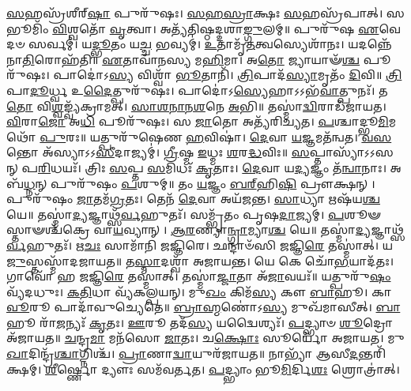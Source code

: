 

\-\ul{𑌸}\-𑌹𑌸𑍍𑌰᳴𑌶𑍀𑌰𑍍‌\-\ul{𑌷𑌾} 𑌪𑍁𑌰𑍁᳴𑌷𑌃। 
\-\ul{𑌸}\-\-\ul{𑌹}\-\-\ul{𑌸𑍍𑌰𑌾}\-𑌕𑍍𑌷𑌃 \ul{𑌸}\-𑌹𑌸𑍍𑌰᳴𑌪𑌾𑌤𑍍। 
𑌸 𑌭𑍂𑌮𑌿𑌂᳴ \ul{𑌵𑌿}\-𑌶𑍍𑌵𑌤𑍋᳴ \ul{𑌵𑍃}\-𑌤𑍍𑌵𑌾। 
𑌅𑌤𑍍𑌯᳴𑌤𑌿𑌷𑍍𑌠𑌦𑍍𑌦𑌶𑌾\-\ul{𑌙𑍍𑌗𑍁}\-𑌲𑌮𑍍॥ 
% 
𑌪𑍁𑌰𑍁᳴𑌷 \ul{𑌏}\-𑌵𑍇𑌦𑍞 𑌸𑌰𑍍𑌵𑌮𑍍॑। 
𑌯\-\ul{𑌦𑍍𑌭𑍂}\-𑌤𑌂 𑌯\-\ul{𑌚𑍍𑌚} 𑌭𑌵𑍍𑌯𑌮𑍍॑। 
\-\ul{𑌉}\-𑌤𑌾𑌮𑍃᳴\-\ul{𑌤}\-𑌤𑍍𑌵𑌸𑍍𑌯𑍇𑌶𑌾᳴𑌨𑌃। 
𑌯𑌦𑌨𑍍𑌨𑍇᳴𑌨𑌾\-\ul{𑌤𑌿}\-𑌰𑍋𑌹᳴𑌤𑌿॥ 
% 
\-\ul{𑌏}\-𑌤𑌾𑌵𑌾᳴𑌨𑌸𑍍𑌯 𑌮\-\ul{𑌹𑌿}\-𑌮𑌾। 
𑌅\-\ul{𑌤𑍋} 𑌜𑍍𑌯𑌾𑌯𑌾𑍟᳴\-\ul{𑌶𑍍𑌚} 𑌪𑍂𑌰𑍁᳴𑌷𑌃। 
𑌪𑌾𑌦𑍋॑𑌽\-\ul{𑌸𑍍𑌯} 𑌵𑌿𑌶𑍍𑌵𑌾᳴ \ul{𑌭𑍂}\-𑌤𑌾𑌨𑌿᳴। 
\-\ul{𑌤𑍍𑌰𑌿}\-𑌪𑌾𑌦᳴\-\ul{𑌸𑍍𑌯𑌾}\-𑌮𑍃𑌤𑌂᳴ \ul{𑌦𑌿}\-𑌵𑌿॥ 
% 
\-\ul{𑌤𑍍𑌰𑌿}\-𑌪𑌾\-\ul{𑌦𑍂}\-𑌰𑍍𑌧𑍍𑌵 𑌉\-\ul{𑌦𑍈}\-𑌤𑍍𑌪𑍁𑌰𑍁᳴𑌷𑌃। 
𑌪𑌾𑌦𑍋॑𑌽\-\ul{𑌸𑍍𑌯𑍇}\-𑌹𑌾𑌽𑌽𑌭᳴\-\ul{𑌵𑌾}\-𑌤𑍍𑌪𑍁𑌨𑌃᳴। 
𑌤\-\ul{𑌤𑍋} 𑌵𑌿\-\ul{𑌶𑍍𑌵}\-𑌙𑍍𑌵𑍍𑌯᳴𑌕𑍍𑌰𑌾𑌮𑌤𑍍। 
\-\ul{𑌸𑌾}\-\-\ul{𑌶}\-\-\ul{𑌨𑌾}\-\-\ul{𑌨}\-\-\ul{𑌶}\-𑌨𑍇 \ul{𑌅}\-𑌭𑌿॥ 
% 
𑌤𑌸𑍍𑌮𑌾॑\-\ul{𑌦𑍍𑌵𑌿}\-𑌰𑌾𑌡᳴𑌜𑌾𑌯𑌤। 
\-\ul{𑌵𑌿}\-𑌰𑌾\-\ul{𑌜𑍋} 𑌅\-\ul{𑌧𑌿} 𑌪𑍂𑌰𑍁᳴𑌷𑌃। 
𑌸 \ul{𑌜𑌾}\-𑌤𑍋 𑌅𑌤𑍍𑌯᳴𑌰𑌿𑌚𑍍𑌯𑌤। 
\-\ul{𑌪}\-𑌶𑍍𑌚𑌾𑌦𑍍𑌭𑍂\-\ul{𑌮𑌿}\-𑌮𑌥𑍋᳴ \ul{𑌪𑍁}\-𑌰𑌃॥ 
% 
 𑌯𑌤𑍍𑌪𑍁𑌰𑍁᳴𑌷𑍇𑌣 \ul{𑌹}\-𑌵𑌿𑌷𑌾॑। 
\-\ul{𑌦𑍇}\-𑌵𑌾 \ul{𑌯}\-𑌜𑍍𑌞𑌮𑌤᳴𑌨𑍍𑌵𑌤। 
\-\ul{𑌵}\-\-\ul{𑌸}\-𑌨𑍍𑌤𑍋 𑌅᳴𑌸𑍍𑌯𑌾𑌽𑌽\-\ul{𑌸𑍀}\-𑌦𑌾𑌜𑍍𑌯𑌮𑍍॑। 
\-\ul{𑌗𑍍𑌰𑍀}\-𑌷𑍍𑌮 \ul{𑌇}\-𑌧𑍍𑌮𑌃 \ul{𑌶}\-𑌰\-\ul{𑌦𑍍𑌧}\-𑌵𑌿𑌃॥ 
% 
 \ul{𑌸}\-𑌪𑍍𑌤𑌾𑌸𑍍𑌯𑌾᳴𑌽𑌽𑌸𑌨𑍍  𑌪\-\ul{𑌰𑌿}\-𑌧𑌯𑌃᳴। 
𑌤𑍍𑌰𑌿𑌃 \ul{𑌸}\-𑌪𑍍𑌤 \ul{𑌸}\-𑌮𑌿𑌧𑌃᳴ \ul{𑌕𑍃}\-𑌤𑌾𑌃। 
\-\ul{𑌦𑍇}\-𑌵𑌾 𑌯\-\ul{𑌦𑍍𑌯}\-𑌜𑍍𑌞𑌂 𑌤᳴\-\ul{𑌨𑍍𑌵𑌾}\-𑌨𑌾𑌃। 
𑌅𑌬᳴\-\ul{𑌧𑍍𑌨}\-𑌨𑍍 𑌪𑍁𑌰𑍁᳴𑌷𑌂 \ul{𑌪}\-𑌶𑍁𑌮𑍍॥ 
% 
 𑌤𑌂 \ul{𑌯}\-𑌜𑍍𑌞𑌂 \ul{𑌬}\-\ul{𑌰𑍍}‌𑌹𑌿\-\ul{𑌷𑌿} 𑌪𑍍𑌰𑍗𑌕𑍍𑌷𑌨𑍍। 
𑌪𑍁𑌰𑍁᳴𑌷𑌂 \ul{𑌜𑌾}\-𑌤𑌮᳴\-\ul{𑌗𑍍𑌰}\-𑌤𑌃। 
𑌤𑍇𑌨᳴ \ul{𑌦𑍇}\-𑌵𑌾 𑌅𑌯᳴𑌜𑌨𑍍𑌤। 
\-\ul{𑌸𑌾}\-𑌧𑍍𑌯𑌾 𑌋𑌷᳴𑌯\-\ul{𑌶𑍍𑌚} 𑌯𑍇॥ 
% 
𑌤𑌸𑍍𑌮𑌾॑\-\ul{𑌦𑍍𑌯}\-𑌜𑍍𑌞𑌾𑌥𑍍𑌸᳴\-\ul{𑌰𑍍𑌵}\-𑌹𑍁𑌤𑌃᳴। 
𑌸𑌮𑍍𑌭𑍃᳴𑌤𑌂 𑌪𑍃𑌷\-\ul{𑌦𑌾}\-𑌜𑍍𑌯𑌮𑍍। 
\-\ul{𑌪}\-𑌶𑍂𑍟𑌸𑍍𑌤𑌾𑍟𑌶𑍍𑌚᳴𑌕𑍍𑌰𑍇 𑌵𑌾\-\ul{𑌯}\-𑌵𑍍𑌯𑌾𑌨𑍍। 
\-\ul{𑌆}\-\-\ul{𑌰}\-𑌣𑍍𑌯𑌾\-\ul{𑌨𑍍𑌗𑍍𑌰𑌾}\-𑌮𑍍𑌯𑌾\-\ul{𑌶𑍍𑌚} 𑌯𑍇॥ 
% 
 𑌤𑌸𑍍𑌮𑌾॑\-\ul{𑌦𑍍𑌯}\-𑌜𑍍𑌞𑌾𑌥𑍍𑌸᳴\-\ul{𑌰𑍍𑌵}\-𑌹𑍁𑌤𑌃᳴। 
𑌋\-\ul{𑌚𑌃} 𑌸𑌾𑌮𑌾᳴𑌨𑌿 𑌜𑌜𑍍𑌞𑌿𑌰𑍇। 
𑌛𑌨𑍍𑌦𑌾𑍞᳴𑌸𑌿 𑌜𑌜𑍍𑌞𑌿\-\ul{𑌰𑍇} 𑌤𑌸𑍍𑌮𑌾॑𑌤𑍍। 
𑌯\-\ul{𑌜𑍁}\-𑌸𑍍𑌤𑌸𑍍𑌮𑌾᳴𑌦𑌜𑌾𑌯𑌤॥ 
% 
𑌤\-\ul{𑌸𑍍𑌮𑌾}\-𑌦𑌶𑍍𑌵𑌾᳴ 𑌅𑌜𑌾𑌯𑌨𑍍𑌤। 
𑌯𑍇 𑌕𑍇 𑌚𑍋᳴\-\ul{𑌭}\-𑌯𑌾𑌦᳴𑌤𑌃। 
𑌗𑌾𑌵𑍋᳴ 𑌹 𑌜𑌜𑍍𑌞𑌿\-\ul{𑌰𑍇} 𑌤𑌸𑍍𑌮𑌾॑𑌤𑍍। 
𑌤𑌸𑍍𑌮𑌾॑\-\ul{𑌜𑍍𑌜𑌾}\-𑌤𑌾 𑌅᳴\-\ul{𑌜𑌾}\-𑌵𑌯𑌃᳴॥ 
% 
𑌯𑌤𑍍𑌪𑍁𑌰𑍁᳴\-\ul{𑌷𑌂} 𑌵𑍍𑌯᳴𑌦𑌧𑍁𑌃। 
\-\ul{𑌕}\-\-\ul{𑌤𑌿}\-𑌧𑌾 𑌵𑍍𑌯᳴𑌕𑌲𑍍𑌪𑌯𑌨𑍍। 
𑌮𑍁\-\ul{𑌖𑌂} 𑌕𑌿𑌮᳴\-\ul{𑌸𑍍𑌯} 𑌕𑍗 \ul{𑌬𑌾}\-𑌹𑍂। 
𑌕𑌾\-\ul{𑌵𑍂}\-𑌰𑍂 𑌪𑌾𑌦𑌾᳴𑌵𑍁𑌚𑍍𑌯𑍇𑌤𑍇॥ 
% 
\-\ul{𑌬𑍍𑌰𑌾}\-\-\ul{𑌹𑍍𑌮}\-𑌣𑍋॑𑌽\-\ul{𑌸𑍍𑌯} 𑌮𑍁𑌖᳴𑌮𑌾𑌸𑍀𑌤𑍍। 
\-\ul{𑌬𑌾}\-𑌹𑍂 𑌰𑌾᳴\-\ul{𑌜}\-𑌨𑍍𑌯𑌃᳴ \ul{𑌕𑍃}\-𑌤𑌃। 
\-\ul{𑌊}\-𑌰𑍂 𑌤𑌦᳴\-\ul{𑌸𑍍𑌯} 𑌯𑌦𑍍𑌵𑍈𑌶𑍍𑌯𑌃᳴। 
\-\ul{𑌪}\-𑌦𑍍𑌭𑍍𑌯𑌾𑍞 \ul{𑌶𑍂}\-𑌦𑍍𑌰𑍋 𑌅᳴𑌜𑌾𑌯𑌤॥ 
% 
\-\ul{𑌚}\-𑌨𑍍𑌦𑍍𑌰\-\ul{𑌮𑌾} 𑌮𑌨᳴𑌸𑍋 \ul{𑌜𑌾}\-𑌤𑌃। 
𑌚\-\ul{𑌕𑍍𑌷𑍋𑌃} 𑌸𑍂𑌰𑍍𑌯𑍋᳴ 𑌅𑌜𑌾𑌯𑌤। 
𑌮𑍁\-\ul{𑌖𑌾}\-𑌦𑌿𑌨𑍍𑌦𑍍𑌰᳴\-\ul{𑌶𑍍𑌚𑌾}\-𑌗𑍍𑌨𑌿𑌶𑍍𑌚᳴। 
\-\ul{𑌪𑍍𑌰𑌾}\-𑌣𑌾\-\ul{𑌦𑍍𑌵𑌾}\-𑌯𑍁𑌰᳴𑌜𑌾𑌯𑌤॥ 
% 
𑌨𑌾𑌭𑍍𑌯𑌾᳴ 𑌆𑌸𑍀\-\ul{𑌦}\-𑌨𑍍𑌤𑌰𑌿᳴𑌕𑍍𑌷𑌮𑍍। 
\-\ul{𑌶𑍀}\-𑌰𑍍𑌷𑍍𑌣𑍋 𑌦𑍍𑌯𑍗𑌃 𑌸𑌮᳴𑌵𑌰𑍍𑌤𑌤। 
\-\ul{𑌪}\-𑌦𑍍𑌭𑍍𑌯𑌾𑌂 𑌭𑍂\-\ul{𑌮𑌿}\-𑌰𑍍𑌦𑌿\-\ul{𑌶𑌃} 𑌶𑍍𑌰𑍋𑌤𑍍𑌰𑌾॑𑌤𑍍। 
